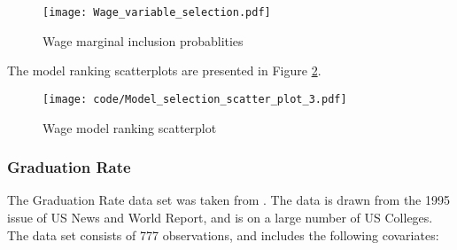 \documentclass{amsart}[12pt]
\begin{document}
\begin{figure}[p]
	\texttt{[image: Wage\_variable\_selection.pdf]}
	\caption{Wage marginal inclusion probablities}
	\label{fig:Wage_inclusion}
\end{figure}

The model ranking scatterplots are presented in Figure \ref{fig:Wage_model_ranking}.

\begin{figure}[p]
	\texttt{[image: code/Model\_selection\_scatter\_plot\_3.pdf]}
	\caption{Wage model ranking scatterplot}
	\label{fig:Wage_model_ranking}
\end{figure}


\subsubsection{Graduation Rate}

The Graduation Rate data set was taken from \cite{James:2014:ISL:2517747}. The data is drawn from the 1995
issue of US News and World Report, and is on a large number of US Colleges. The data set consists of 777
observations, and includes the following covariates:
\end{document}
